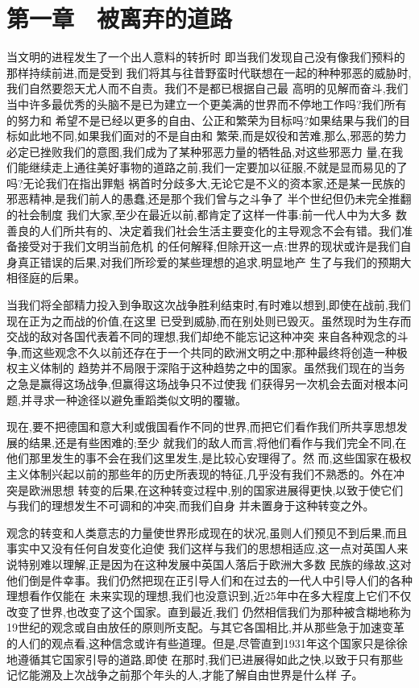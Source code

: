 ﻿\documentclass[12pt]{article}
\begin{document}
\section{第一章　被离弃的道路}


当文明的进程发生了一个出人意料的转折时 \myrule 即当我们发现自己没有像我们预料的那样持续前进,而是受到
我们将其与往昔野蛮时代联想在一起的种种邪恶的威胁时,我们自然要怨天尤人而不自责。我们不是都已根据自己最
高明的见解而奋斗,我们当中许多最优秀的头脑不是已为建立一个更美满的世界而不停地工作吗?我们所有的努力和
希望不是已经以更多的自由、公正和繁荣为目标吗?如果结果与我们的目标如此地不同,如果我们面对的不是自由和
繁荣,而是奴役和苦难,那么,邪恶的势力必定已挫败我们的意图,我们成为了某种邪恶力量的牺牲品,对这些邪恶力
量,在我们能继续走上通往美好事物的道路之前,我们一定要加以征服,不就是显而易见的了吗?无论我们在指出罪魁
祸首时分歧多大,无论它是不义的资本家,还是某一民族的邪恶精神,是我们前人的愚蠢,还是那个我们曾与之斗争了
半个世纪但仍未完全推翻的社会制度 \myrule 我们大家,至少在最近以前,都肯定了这样一件事:前一代人中为大多
数善良的人们所共有的、决定着我们社会生活主要变化的主导观念不会有错。我们准备接受对于我们文明当前危机
的任何解释,但除开这一点:世界的现状或许是我们自身真正错误的后果,对我们所珍爱的某些理想的追求,明显地产
生了与我们的预期大相径庭的后果。

当我们将全部精力投入到争取这次战争胜利结束时,有时难以想到,即使在战前,我们现在正为之而战的价值,在这里
已受到威胁,而在别处则已毁灭。虽然现时为生存而交战的敌对各国代表着不同的理想,我们却绝不能忘记这种冲突
来自各种观念的斗争,而这些观念不久以前还存在于一个共同的欧洲文明之中;那种最终将创造一种极权主义体制的
趋势并不局限于深陷于这种趋势之中的国家。虽然我们现在的当务之急是赢得这场战争,但赢得这场战争只不过使我
们获得另一次机会去面对根本问题,并寻求一种途径以避免重蹈类似文明的覆辙。

现在,要不把德国和意大利或俄国看作不同的世界,而把它们看作我们所共享思想发展的结果,还是有些困难的;至少
就我们的敌人而言,将他们看作与我们完全不同,在他们那里发生的事不会在我们这里发生,是比较心安理得了。然
而,这些国家在极权主义体制兴起以前的那些年的历史所表现的特征,几乎没有我们不熟悉的。外在冲突是欧洲思想
转变的后果,在这种转变过程中,别的国家进展得更快,以致于使它们与我们的理想发生不可调和的冲突,而我们自身
并未置身于这种转变之外。

观念的转变和人类意志的力量使世界形成现在的状况,虽则人们预见不到后果,而且事实中又没有任何自发变化迫使
我们这样与我们的思想相适应,这一点对英国人来说特别难以理解,正是因为在这种发展中英国人落后于欧洲大多数
民族的缘故,这对他们倒是件幸事。我们仍然把现在正引导人们和在过去的一代人中引导人们的各种理想看作仅能在
未来实现的理想,我们也没意识到,近25年中在多大程度上它们不仅改变了世界,也改变了这个国家。直到最近,我们
仍然相信我们为那种被含糊地称为19世纪的观念或自由放任的原则所支配。与其它各国相比,并从那些急于加速变革
的人们的观点看,这种信念或许有些道理。但是,尽管直到1931年这个国家只是徐徐地遵循其它国家引导的道路,即使
在那时,我们已进展得如此之快,以致于只有那些记忆能溯及上次战争之前那个年头的人,才能了解自由世界是什么样
子。
\end{document}
